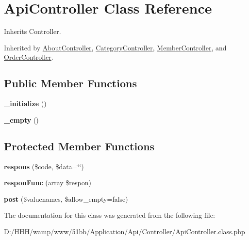 \hypertarget{class_api_1_1_controller_1_1_api_controller}{}\section{Api\+Controller Class Reference}
\label{class_api_1_1_controller_1_1_api_controller}


Inherits Controller.



Inherited by \hyperlink{class_api_1_1_controller_1_1_about_controller}{About\+Controller}, \hyperlink{class_api_1_1_controller_1_1_category_controller}{Category\+Controller}, \hyperlink{class_api_1_1_controller_1_1_member_controller}{Member\+Controller}, and \hyperlink{class_api_1_1_controller_1_1_order_controller}{Order\+Controller}.

\subsection*{Public Member Functions}
\begin{DoxyCompactItemize}
\item 
\hypertarget{class_api_1_1_controller_1_1_api_controller_aa4239198c895a9c8c1ea86753ed49095}{}{\bfseries \+\_\+initialize} ()\label{class_api_1_1_controller_1_1_api_controller_aa4239198c895a9c8c1ea86753ed49095}

\item 
\hypertarget{class_api_1_1_controller_1_1_api_controller_ad2d4a33bbca1111bac8005fec672bdde}{}{\bfseries \+\_\+empty} ()\label{class_api_1_1_controller_1_1_api_controller_ad2d4a33bbca1111bac8005fec672bdde}

\end{DoxyCompactItemize}
\subsection*{Protected Member Functions}
\begin{DoxyCompactItemize}
\item 
\hypertarget{class_api_1_1_controller_1_1_api_controller_ac196d7c60faeefbfcf58d3e28bf6eecf}{}{\bfseries respons} (\$code, \$data=\char`\"{}\char`\"{})\label{class_api_1_1_controller_1_1_api_controller_ac196d7c60faeefbfcf58d3e28bf6eecf}

\item 
\hypertarget{class_api_1_1_controller_1_1_api_controller_a037218a3dc1e824a0a3f2eaf7f7227b4}{}{\bfseries respon\+Func} (array \$respon)\label{class_api_1_1_controller_1_1_api_controller_a037218a3dc1e824a0a3f2eaf7f7227b4}

\item 
\hypertarget{class_api_1_1_controller_1_1_api_controller_a5d0a034b2bac23e9375f6e5b6a737c48}{}{\bfseries post} (\$valuenames, \$allow\+\_\+empty=false)\label{class_api_1_1_controller_1_1_api_controller_a5d0a034b2bac23e9375f6e5b6a737c48}

\end{DoxyCompactItemize}


The documentation for this class was generated from the following file\+:\begin{DoxyCompactItemize}
\item 
D\+:/\+H\+H\+H/wamp/www/51bb/\+Application/\+Api/\+Controller/Api\+Controller.\+class.\+php\end{DoxyCompactItemize}
